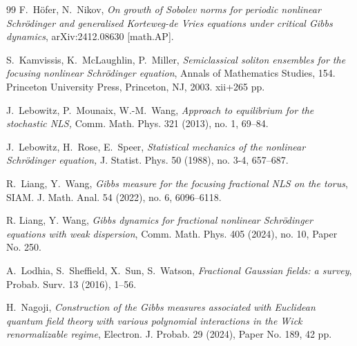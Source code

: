 \documentclass[letterpaper, 11pt,  reqno]{amsart}
\numberwithin{equation}{section}
\numberwithin{theorem}{section}
\begin{document}
\begin{thebibliography}{99}
F.~H\"ofer, N.~Nikov,
{\it 
On growth of Sobolev norms for periodic nonlinear Schr\"odinger and generalised Korteweg-de Vries equations under critical Gibbs dynamics}, 
arXiv:2412.08630 [math.AP].



S.~Kamvissis, K.~McLaughlin, P.~Miller, 
{\it Semiclassical soliton ensembles for the focusing nonlinear Schr\"odinger equation}, 
Annals of Mathematics Studies, 154. Princeton University Press, Princeton, NJ, 2003. xii+265 pp.





J.~Lebowitz, P.~Mounaix, W.-M.~Wang, 
{\it Approach to equilibrium for the stochastic NLS,} Comm. Math. Phys. 321 (2013), no. 1, 69--84.

	
J.~Lebowitz, H.~Rose, E.~Speer, 
{\it Statistical mechanics of the nonlinear Schr\"odinger equation,}
J. Statist. Phys. 50 (1988), no. 3-4, 657--687. 
	
	
	
R.~Liang,  Y.~Wang, 
{\it Gibbs measure for the focusing fractional NLS on the torus}, 
SIAM. J. Math. Anal. 54 (2022), no. 6, 6096--6118.
	
R. Liang, Y. Wang, 
{\it Gibbs dynamics for fractional nonlinear Schr\"odinger equations with weak dispersion}, Comm. Math. Phys. 405 (2024), no. 10, Paper No. 250.
	
	
A.~Lodhia, S.~Sheffield, X.~Sun, S.~Watson, 
{\it  
Fractional Gaussian fields: a survey},
Probab. Surv. 13 (2016), 1--56. 


	
	
H.~Nagoji, 
{\it Construction of the Gibbs measures associated with Euclidean quantum field theory with various polynomial interactions in the Wick renormalizable regime},
 Electron. J. Probab. 29 (2024), Paper No. 189, 42 pp. 


\end{thebibliography}
\end{document}
